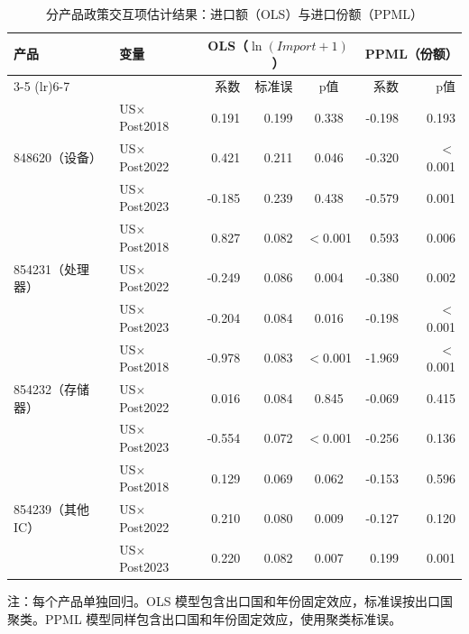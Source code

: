\begin{table}[H]
\centering
\caption{分产品政策交互项估计结果：进口额（OLS）与进口份额（PPML）}
\label{tab:product-regression}
\begin{tabular}{llrrc rr}
\toprule
\multirow{2}{*}{产品} & \multirow{2}{*}{变量} & \multicolumn{3}{c}{OLS（$\ln(Import+1)$）} & \multicolumn{2}{c}{PPML（份额）} \\
\cmidrule(lr){3-5} \cmidrule(lr){6-7}
 & & 系数 & 标准误 & p值 & 系数 & p值 \\
\midrule
\multirow{3}{*}{848620（设备）}
 & US$\times$Post2018 & 0.191 & 0.199 & 0.338 & -0.198 & 0.193 \\
 & US$\times$Post2022 & 0.421 & 0.211 & 0.046 & -0.320 & $<$0.001 \\
 & US$\times$Post2023 & -0.185 & 0.239 & 0.438 & -0.579 & 0.001 \\
\midrule
\multirow{3}{*}{854231（处理器）}
 & US$\times$Post2018 & 0.827 & 0.082 & $<$0.001 & 0.593 & 0.006 \\
 & US$\times$Post2022 & -0.249 & 0.086 & 0.004 & -0.380 & 0.002 \\
 & US$\times$Post2023 & -0.204 & 0.084 & 0.016 & -0.198 & $<$0.001 \\
\midrule
\multirow{3}{*}{854232（存储器）}
 & US$\times$Post2018 & -0.978 & 0.083 & $<$0.001 & -1.969 & $<$0.001 \\
 & US$\times$Post2022 & 0.016 & 0.084 & 0.845 & -0.069 & 0.415 \\
 & US$\times$Post2023 & -0.554 & 0.072 & $<$0.001 & -0.256 & 0.136 \\
\midrule
\multirow{3}{*}{854239（其他IC）}
 & US$\times$Post2018 & 0.129 & 0.069 & 0.062 & -0.153 & 0.596 \\
 & US$\times$Post2022 & 0.210 & 0.080 & 0.009 & -0.127 & 0.120 \\
 & US$\times$Post2023 & 0.220 & 0.082 & 0.007 & 0.199 & 0.001 \\
\bottomrule
\end{tabular}

\vspace{0.5em}
\begin{minipage}{0.95\linewidth}
\footnotesize
注：每个产品单独回归。OLS 模型包含出口国和年份固定效应，标准误按出口国聚类。PPML 模型同样包含出口国和年份固定效应，使用聚类标准误。
\end{minipage}
\end{table}
